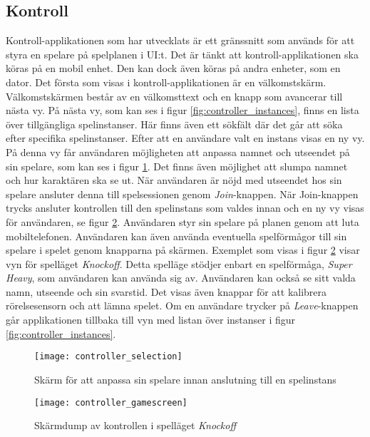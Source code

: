 \subsection{Kontroll}
Kontroll-applikationen som har utvecklats är ett gränssnitt som används för att styra en spelare på spelplanen i UI:t. Det är tänkt att kontroll-applikationen ska köras på en mobil enhet. Den kan dock även köras på andra enheter, som en dator. Det första som visas i kontroll-applikationen är en välkomstskärm. Välkomstskärmen består av en välkomsttext och en knapp som avancerar till nästa vy. På nästa vy, som kan ses i figur \ref{fig:controller_instances}, finns en lista över tillgängliga spelinstanser. Här finns även ett sökfält där det går att söka efter specifika spelinstanser. Efter att en användare valt en instans visas en ny vy. På denna vy får användaren möjligheten att anpassa namnet och utseendet på sin spelare, som kan ses i figur \ref{fig:controller_selection}. Det finns även möjlighet att slumpa namnet och hur karaktären ska se ut. När användaren är nöjd med utseendet hos sin spelare ansluter denna till spelsessionen genom \textit{Join}-knappen. När Join-knappen trycks ansluter kontrollen till den spelinstans som valdes innan och en ny vy visas för användaren, se figur \ref{fig:controller_gamescreen}. Användaren styr sin spelare på planen genom att luta mobiltelefonen. Användaren kan även använda eventuella spelförmågor till sin spelare i spelet genom knapparna på skärmen. Exemplet som visas i figur \ref{fig:controller_gamescreen} visar vyn för spelläget \textit{Knockoff}. Detta spelläge stödjer enbart en spelförmåga, \textit{Super Heavy}, som användaren kan använda sig av. Användaren kan också se sitt valda namn, utseende och sin svarstid. Det visas även knappar för att kalibrera rörelsesensorn och att lämna spelet. Om en användare trycker på \textit{Leave}-knappen går applikationen tillbaka till vyn med listan över instanser i figur \ref{fig:controller_instances}.

\begin{figure}[H]
    \centering
    \texttt{[image: controller\_selection]}
    \caption{Skärm för att anpassa sin spelare innan anslutning till en spelinstans}
    \label{fig:controller_selection}
\end{figure}

\begin{figure}[H]
    \centering
    \texttt{[image: controller\_gamescreen]}
    \caption{Skärmdump av kontrollen i spelläget \textit{Knockoff}}
    \label{fig:controller_gamescreen}
\end{figure}


